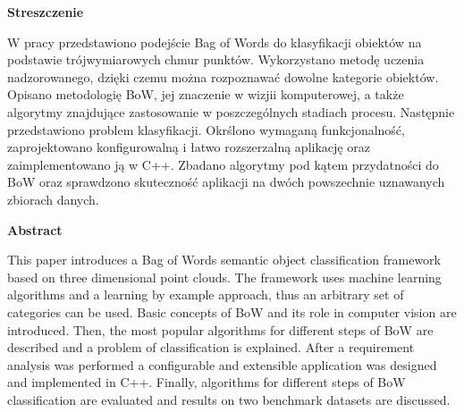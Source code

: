 \begin{center}
\begin{LARGE}\textbf{Streszczenie}\end{LARGE}
\end{center}

\vspace{1.0cm}

	W pracy przedstawiono podejście Bag of Words do klasyfikacji obiektów na podstawie trójwymiarowych chmur punktów. Wykorzystano metodę uczenia nadzorowanego, dzięki czemu można rozpoznawać dowolne kategorie obiektów. Opisano metodologię BoW, jej znaczenie w wizjii komputerowej, a także algorytmy znajdujące zastosowanie w poszczególnych stadiach procesu. Następnie przedstawiono problem klasyfikacji. Okrślono wymaganą funkcjonalność, zaprojektowano konfigurowalną i łatwo rozszerzalną aplikację oraz zaimplementowano ją w C++. Zbadano algorytmy pod kątem przydatności do BoW oraz sprawdzono skuteczność aplikacji na dwóch powszechnie uznawanych zbiorach danych.

\vspace{3.0cm}

\begin{center}
\begin{LARGE}\textbf{Abstract}\end{LARGE}
\end{center}

\vspace{1.0cm}

	This paper introduces a Bag of Words semantic object classification framework based on three dimensional point clouds. The framework uses machine learning algorithms and a learning by example approach, thus an arbitrary set of categories can be used. Basic concepts of BoW and its role in computer vision are introduced. Then, the most popular algorithms for different steps of BoW are described and a problem of classification is explained. After a requirement analysis was performed a configurable and extensible application was designed and implemented in C++. Finally, algorithms for different steps of BoW classification are evaluated and results on two benchmark datasets are discussed.
	

	
	


